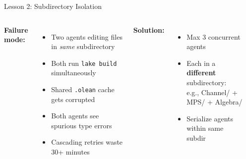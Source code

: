 \documentclass[aspectratio=169,10pt]{beamer}
\begin{document}
\begin{frame}{Lesson 2: Subdirectory Isolation}
    \vspace{-0.3em}
    \begin{columns}[T]
        \textbf{\textcolor{softred}{Failure mode:}}
        \begin{itemize}\itemsep0.2em\small
            \item Two agents editing files in \emph{same} subdirectory
            \item Both run \texttt{lake build} simultaneously
            \item Shared \texttt{.olean} cache gets corrupted
            \item Both agents see spurious type errors
            \item Cascading retries waste 30+ minutes
        \end{itemize}

        \vspace{0.3em}
        \textbf{\textcolor{leangreen}{Solution:}}
        \begin{itemize}\itemsep0.2em\small
            \item Max \textcolor{leangreen}{3 concurrent agents}
            \item Each in a \textbf{different} subdirectory:\\
                  e.g., Channel/ + MPS/ + Algebra/
            \item Serialize agents within same subdir
        \end{itemize}

        \begin{center}
\end{center}
\end{columns}
\end{frame}
\end{document}
